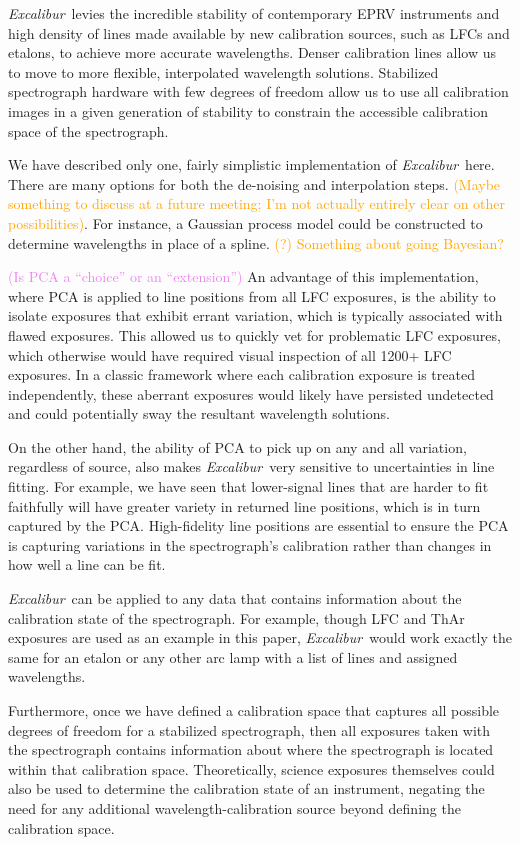 \documentclass[modern]{aastex63}
\newcommand{\project}[1]{\textsl{#1}}
\newcommand{\name}{\project{Excalibur}}
\newcommand{\lz}[1]{\textcolor{orange}{#1}}
\newcommand{\mb}[1]{\textcolor{violet}{#1}}
\begin{document}
\name\ levies the incredible stability of contemporary EPRV instruments and high density of lines made available by new calibration sources, such as LFCs and etalons, to achieve more accurate wavelengths.  Denser calibration lines allow us to move to more flexible, interpolated wavelength solutions.  Stabilized spectrograph hardware with few degrees of freedom allow us to use all calibration images in a given generation of stability to constrain the accessible calibration space of the spectrograph.

We have described only one, fairly simplistic implementation of \name\ here.  There are many options for both the de-noising and interpolation steps.  \lz{(Maybe something to discuss at a future meeting; I'm not actually entirely clear on other possibilities)}.  For instance, a Gaussian process model could be constructed to determine wavelengths in place of a spline. \lz{(?)}  \lz{Something about going Bayesian?}

\mb{(Is PCA a ``choice'' or an ``extension'')}
An advantage of this implementation, where PCA is applied to line positions from all LFC exposures, is the ability to isolate exposures that exhibit errant variation, which is typically associated with flawed exposures.  This allowed us to quickly vet for problematic LFC exposures, which otherwise would have required visual inspection of all 1200+ LFC exposures.  In a classic framework where each calibration exposure is treated independently, these aberrant exposures would likely have persisted undetected and could potentially sway the resultant wavelength solutions.

On the other hand, the ability of PCA to pick up on any and all variation, regardless of source, also makes \name\ very sensitive to uncertainties in line fitting.  For example, we have seen that lower-signal lines that are harder to fit faithfully will have greater variety in returned line positions, which is in turn captured by the PCA.  High-fidelity line positions are essential to ensure the PCA is capturing variations in the spectrograph's calibration rather than changes in how well a line can be fit.

\name\ can be applied to any data that contains information about the calibration state of the spectrograph.  For example, though LFC and ThAr exposures are used as an example in this paper, \name\ would work exactly the same for an etalon or any other arc lamp with a list of lines and assigned wavelengths.

Furthermore, once we have defined a calibration space that captures all possible degrees of freedom for a stabilized spectrograph, then all exposures taken with the spectrograph contains information about where the spectrograph is located within that calibration space.  Theoretically, science exposures themselves could also be used to determine the calibration state of an instrument, negating the need for any additional wavelength-calibration source beyond defining the calibration space.
\end{document}
